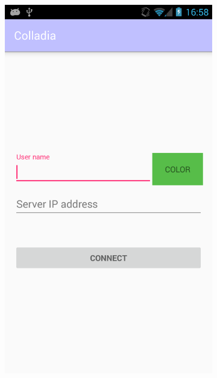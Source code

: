 		\vspace*{\fill}
		\begin{figure}[!h]
			\centering
			\begin{subfigure}[t]{.3\textwidth}
				\includegraphics[width=\textwidth]{img/screen/new/colladia_connexion}
			\end{subfigure}
			~
			\begin{subfigure}[t]{.3\textwidth}

\end{subfigure}
\end{figure}
